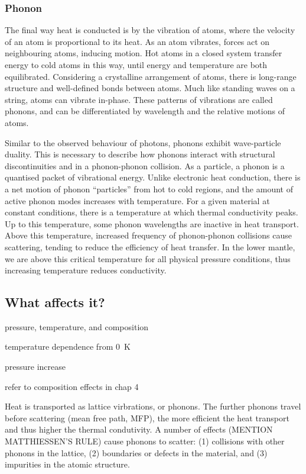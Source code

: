 \subsubsection{Phonon}

The final way heat is conducted is by the vibration of atoms, where the velocity of an atom is proportional to its heat. As an atom vibrates, forces act on neighbouring atoms, inducing motion. Hot atoms in a closed system transfer energy to cold atoms in this way, until energy and temperature are both equilibrated. Considering a crystalline arrangement of atoms, there is long-range structure and well-defined bonds between atoms. Much like standing waves on a string, atoms can vibrate in-phase. These patterns of vibrations are called phonons, and can be differentiated by wavelength and the relative motions of atoms.

Similar to the observed behaviour of photons, phonons exhibit wave-particle duality. This is necessary to describe how phonons interact with structural discontinuities and in a phonon-phonon collision. As a particle, a phonon is a quantised packet of vibrational energy. Unlike electronic heat conduction, there is a net motion of phonon ``particles'' from hot to cold regions, and the amount of active phonon modes increases with temperature. For a given material at constant conditions, there is a temperature at which thermal conductivity peaks. Up to this temperature, some phonon wavelengths are inactive in heat transport. Above this temperature, increased frequency of phonon-phonon collisions cause scattering, tending to reduce the efficiency of heat transfer. In the lower mantle, we are above this critical temperature for all physical pressure conditions, thus increasing temperature reduces conductivity.





\subsection{What affects it?}
pressure, temperature, and composition

temperature dependence from 0~K

pressure increase

refer to composition effects in chap 4

Heat is transported as lattice virbrations, or phonons. The further phonons travel before scattering (mean free path, MFP), the more efficient the heat transport and thus higher the thermal condutivity. A number of effects (MENTION MATTHIESSEN'S RULE) cause phonons to scatter: (1) collisions with other phonons in the lattice, (2) boundaries or defects in the material, and (3) impurities in the atomic structure. 






